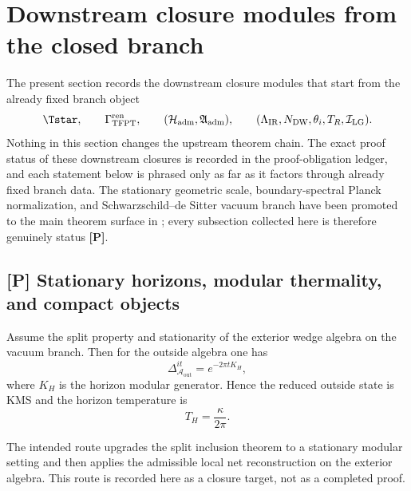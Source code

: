 
\section{Downstream closure modules from the closed branch}
\label{sec:downstream_closure_modules}

The present section records the downstream closure modules that start from the already fixed branch
object
\[
\Tstar,
\qquad
\Gamma_{\mathrm{TFPT}}^{\mathrm{ren}},
\qquad
(\mathcal H_{\mathrm{adm}},\mathfrak A_{\mathrm{adm}}),
\qquad
(\Lambda_{\mathrm{IR}},N_{\mathrm{DW}},\theta_i,T_R,\mathcal I_{\mathrm{LG}}).
\]
Nothing in this section changes the upstream theorem chain. The exact proof status of these
downstream closures is recorded in the proof-obligation ledger, and each statement below is phrased
only as far as it factors through already fixed branch data. The stationary geometric scale,
boundary-spectral Planck normalization, and Schwarzschild--de Sitter vacuum branch have been
promoted to the main theorem surface in ; every
subsection collected here is therefore genuinely status \textbf{[P]}.

\subsection{[P] Stationary horizons, modular thermality, and compact objects}

\begin{conjecture}
\label{thm:modular_horizon_thermality}
Assume the split property and stationarity of the exterior wedge algebra on the vacuum branch. Then
for the outside algebra one has
\[
\Delta_{\mathcal A_{\mathrm{out}}}^{it}=e^{-2\pi t K_H},
\]
where \(K_H\) is the horizon modular generator. Hence the reduced outside state is KMS and the
horizon temperature is
\[
T_H=\frac{\kappa}{2\pi}.
\]
\end{conjecture}

\begin{remark}
The intended route upgrades the split inclusion theorem  to a
stationary modular setting and then applies the admissible local net reconstruction on the exterior
algebra. This route is recorded here as a closure target, not as a completed proof.
\end{remark}

